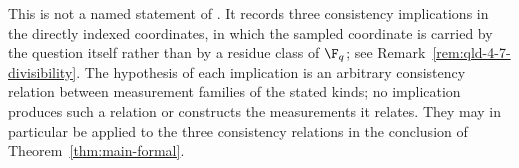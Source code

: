 \begin{lemma}
	\label{lem:direct-ld-consistency-coordinates}
	\leanok
	This is not a named statement of \cite{Ji2020MIPStar}. It records three
	consistency implications in the directly indexed coordinates, in which the
	sampled coordinate is carried by the question itself rather than by a
	residue class of $\F_q$; see Remark~\ref{rem:qld-4-7-divisibility}. The
	hypothesis of each implication is an arbitrary consistency relation
	between measurement families of the stated kinds; no implication produces
	such a relation or constructs the measurements it relates. They may in
	particular be applied to the three consistency relations in the conclusion
	of Theorem~\ref{thm:main-formal}.


\end{lemma}
